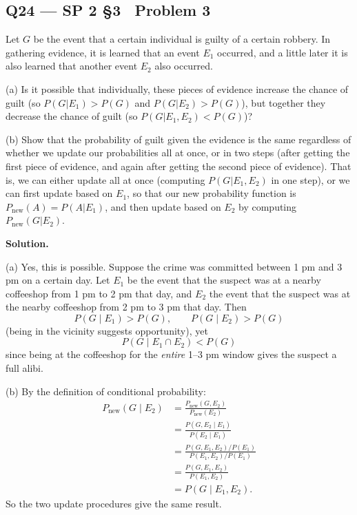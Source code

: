 \documentclass[11pt]{article}
\begin{document}
\subsection*{Q24 --- SP 2 \S3 \textperiodcentered\ Problem 3}
\begin{qbox}
Let $G$ be the event that a certain individual is guilty of a certain robbery. In gathering evidence, it is learned that an event $E_1$ occurred, and a little later it is also learned that another event $E_2$ also occurred.

(a) Is it possible that individually, these pieces of evidence increase the chance of guilt (so $P(G|E_1) > P(G)$ and $P(G|E_2) > P(G)$), but together they decrease the chance of guilt (so $P(G|E_1, E_2) < P(G)$)?

(b) Show that the probability of guilt given the evidence is the same regardless of whether we update our probabilities all at once, or in two steps (after getting the first piece of evidence, and again after getting the second piece of evidence). That is, we can either update all at once (computing $P(G|E_1, E_2)$ in one step), or we can first update based on $E_1$, so that our new probability function is $P_{\text{new}}(A) = P(A|E_1)$, and then update based on $E_2$ by computing $P_{\text{new}}(G|E_2)$.
\end{qbox}
\textbf{Solution.}

(a) Yes, this is possible. Suppose the crime was committed between 1 pm and 3 pm on a certain day. Let $E_1$ be the event that the suspect was at a nearby coffeeshop from 1 pm to 2 pm that day, and $E_2$ the event that the suspect was at the nearby coffeeshop from 2 pm to 3 pm that day. Then
\[
P(G\mid E_1) > P(G), \qquad P(G\mid E_2) > P(G)
\]
(being in the vicinity suggests opportunity), yet
\[
P(G\mid E_1\cap E_2) < P(G)
\]
since being at the coffeeshop for the \emph{entire} 1--3 pm window gives the suspect a full alibi.

(b) By the definition of conditional probability:
\begin{align*}
P_{\text{new}}(G\mid E_2) &= \frac{P_{\text{new}}(G, E_2)}{P_{\text{new}}(E_2)} \\
&= \frac{P(G,E_2\mid E_1)}{P(E_2\mid E_1)} \\
&= \frac{P(G,E_1,E_2)/P(E_1)}{P(E_1,E_2)/P(E_1)} \\
&= \frac{P(G,E_1,E_2)}{P(E_1,E_2)} \\
&= P(G\mid E_1,E_2).
\end{align*}
So the two update procedures give the same result.
\end{document}
